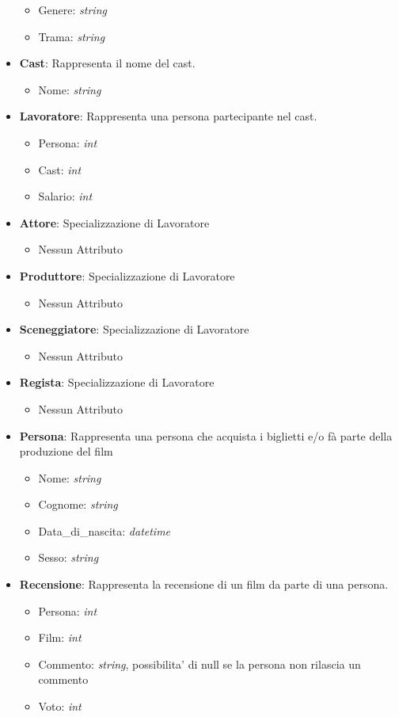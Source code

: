 \documentclass[10pt]{article}
\begin{document}
\begin{itemize}
\begin{itemize}
			\item Genere: \textit{string}
			\item Trama: \textit{string}
		\end{itemize}
		\item \textbf{Cast}: Rappresenta il nome del cast.
		\begin{itemize}
			\item Nome: \textit{string}
		\end{itemize}
		\item \textbf{Lavoratore}: Rappresenta una persona partecipante nel cast.
		\begin{itemize}
			\item Persona: \textit{int}
			\item Cast: \textit{int}
			\item Salario: \textit{int}
		\end{itemize}
		\item \textbf{Attore}: Specializzazione di Lavoratore
		\begin{itemize}
			\item Nessun Attributo
		\end{itemize}
		\item \textbf{Produttore}: Specializzazione di Lavoratore
		\begin{itemize}
			\item Nessun Attributo
		\end{itemize}
		\item \textbf{Sceneggiatore}: Specializzazione di Lavoratore
		\begin{itemize}
			\item Nessun Attributo
		\end{itemize}
		\item \textbf{Regista}: Specializzazione di Lavoratore
		\begin{itemize}
			\item Nessun Attributo
		\end{itemize}
		\item \textbf{Persona}: Rappresenta una persona che acquista i biglietti e/o fà parte della produzione del film
		\begin{itemize}
			\item Nome: \textit{string}
			\item Cognome: \textit{string}
			\item Data\_di\_nascita: \textit{datetime}	
			\item Sesso: \textit{string}
		\end{itemize}
		\item \textbf{Recensione}: Rappresenta la recensione di un film da parte di una persona.
		\begin{itemize}
			\item Persona: \textit{int}
			\item Film: \textit{int}
			\item Commento: \textit{string}, possibilita' di null se la persona non rilascia un commento
			\item Voto: \textit{int}
		\end{itemize}
	\end{itemize}
\end{document}
